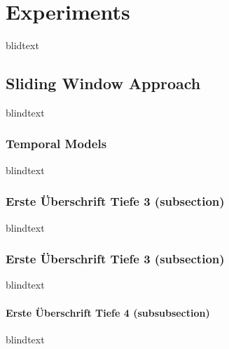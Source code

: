 \chapter{Experiments}
\label{sec:experiments}


blidtext










\section{Sliding Window Approach}
blindtext

\subsection{Temporal Models}
blindtext

\subsection{Erste Überschrift Tiefe 3 (subsection)}
blindtext

\subsection{Erste Überschrift Tiefe 3 (subsection)}
blindtext

\subsubsection{Erste Überschrift Tiefe 4 (subsubsection)}
blindtext
